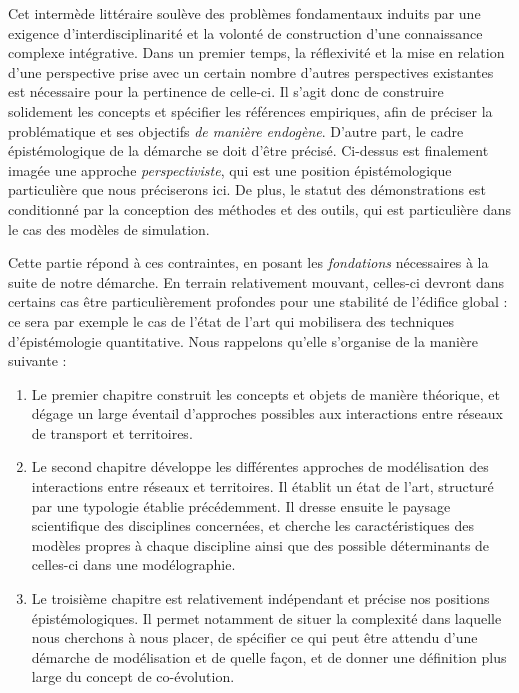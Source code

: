 \bigskip



Cet intermède littéraire soulève des problèmes fondamentaux induits par une exigence d'interdisciplinarité et la volonté de construction d'une connaissance complexe intégrative. Dans un premier temps, la réflexivité et la mise en relation d'une perspective prise avec un certain nombre d'autres perspectives existantes est nécessaire pour la pertinence de celle-ci. Il s'agit donc de construire solidement les concepts et spécifier les références empiriques, afin de préciser la problématique et ses objectifs \emph{de manière endogène}. D'autre part, le cadre épistémologique de la démarche se doit d'être précisé. Ci-dessus est finalement imagée une approche \emph{perspectiviste}, qui est une position épistémologique particulière que nous préciserons ici. De plus, le statut des démonstrations est conditionné par la conception des méthodes et des outils, qui est particulière dans le cas des modèles de simulation.


Cette partie répond à ces contraintes, en posant les \emph{fondations} nécessaires à la suite de notre démarche. En terrain relativement mouvant, celles-ci devront dans certains cas être particulièrement profondes pour une stabilité de l'édifice global : ce sera par exemple le cas de l'état de l'art qui mobilisera des techniques d'épistémologie quantitative. Nous rappelons qu'elle s'organise de la manière suivante :
\begin{enumerate}
	\item Le premier chapitre construit les concepts et objets de manière théorique, et dégage un large éventail d'approches possibles aux interactions entre réseaux de transport et territoires.
	\item Le second chapitre développe les différentes approches de modélisation des interactions entre réseaux et territoires. Il établit un état de l'art, structuré par une typologie établie précédemment. Il dresse ensuite le paysage scientifique des disciplines concernées, et cherche les caractéristiques des modèles propres à chaque discipline ainsi que des possible déterminants de celles-ci dans une modélographie.
	\item Le troisième chapitre est relativement indépendant et précise nos positions épistémologiques. Il permet notamment de situer la complexité dans laquelle nous cherchons à nous placer, de spécifier ce qui peut être attendu d'une démarche de modélisation et de quelle façon, et de donner une définition plus large du concept de co-évolution.
\end{enumerate}




